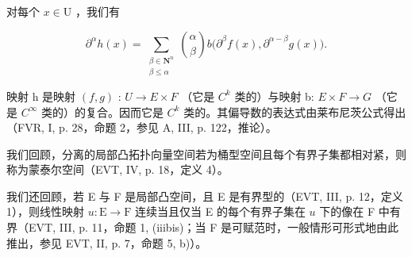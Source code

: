 对每个 \(x \in \mathrm{U}\) ，我们有

\[
\partial^{\alpha}h(x) = \sum_{\substack{\beta \in \mathbf{N}^{n}\\ \beta \leqslant \alpha}}\binom {\alpha}{\beta}b\big(\partial^{\beta}f(x),\partial^{\alpha -\beta}g(x)\big).
\]

映射 h 是映射 \((f,g)\) : \(U \rightarrow E \times F\) （它是 \(C^{k}\) 类的）与映射 b: \(E \times F \rightarrow G\) （它是 \(C^{\infty}\) 类的）的复合。因而它是 \(C^{k}\) 类的。其偏导数的表达式由莱布尼茨公式得出（FVR, I, p. 28，命题 2，参见 A, III, p. 122，推论）。

我们回顾，分离的局部凸拓扑向量空间若为桶型空间且每个有界子集都相对紧，则称为蒙泰尔空间（EVT, IV, p. 18，定义 4）。

我们还回顾，若 E 与 F 是局部凸空间，且 E 是有界型的（EVT, III, p. 12，定义 1），则线性映射 \(u\colon\mathrm{E}\to\mathrm{F}\) 连续当且仅当 E 的每个有界子集在 \(u\) 下的像在 F 中有界（EVT, III, p. 11，命题 1, (iiibis)；当 F 是可赋范时，一般情形可形式地由此推出，参见 EVT, II, p. 7，命题 5, b)）。

